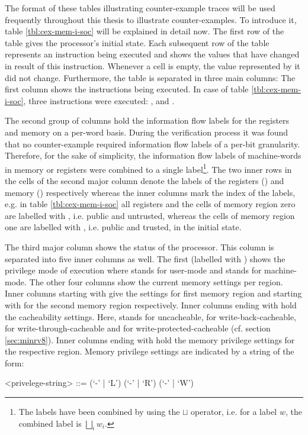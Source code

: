 \begin{example}
    The format of these tables illustrating counter-example traces will be used frequently throughout this thesis to illustrate counter-examples.
    To introduce it, table \ref{tbl:cex-mem-i-soc} will be explained in detail now.
    The first row of the table gives the processor's initial state.
    Each subsequent row of the table represents an instruction being executed and shows the values that have changed in result of this instruction.
    Whenever a cell is empty, the value represented by it did not change.
    Furthermore, the table is separated in three main columns: The first column shows the instructions being executed.
    In case of table \ref{tbl:cex-mem-i-soc}, three instructions were executed: ,  and .

    The second group of columns hold the information flow labels for the registers and memory on a per-word basis.
    During the verification process it was found that no counter-example required information flow labels of a per-bit granularity.
    Therefore, for the sake of simplicity, the information flow labels of machine-words in memory or registers were combined to a single label\footnote{
        The labels have been combined by using the $ \sqcup $ operator, i.e. for a label $ w $, the combined label is $ \bigsqcup_{i} w_i $.
    }.
    The two inner rows in the cells of the second major column denote the labels of the registers () and memory () respectively whereas the inner columns mark the index of the labels, e.g. in table \ref{tbl:cex-mem-i-soc} all registers and the cells of memory region zero are labelled with \PU{}, i.e. public and untrusted, whereas the cells of memory region one are labelled with \PT{}, i.e. public and trusted, in the initial state.

    The third major column shows the status of the processor.
    This column is separated into five inner columns as well.
    The first (labelled with ) shows the privilege mode of execution where  stands for user-mode and  stands for machine-mode.
    The other four columns show the current memory settings per region.
    Inner columns starting with  give the settings for first memory region and starting with  for the second memory region respectively.
    Inner columns ending with  hold the cacheability settings.
    Here,  stands for uncacheable,  for write-back-cacheable,  for write-through-cacheable and  for write-protected-cacheable (cf. section \ref{sec:minrv8}).
    Inner columns ending with  hold the memory privilege settings for the respective region.
    Memory privilege settings are indicated by a string of the form:
    \begin{grammar}
        <privelege-string> ::= (`-' | `L') (`-' | `R') (`-' | `W')
    \end{grammar}


\end{example}
